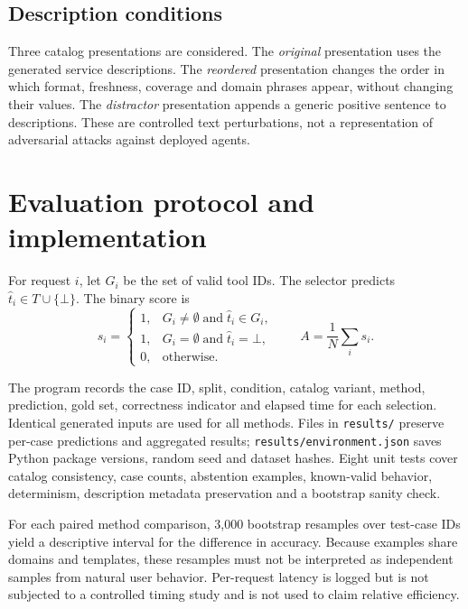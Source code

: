 \documentclass[10pt,a4paper]{article}
\begin{document}
\subsection{Description conditions}
Three catalog presentations are considered. The \emph{original} presentation uses the generated service descriptions. The \emph{reordered} presentation changes the order in which format, freshness, coverage and domain phrases appear, without changing their values. The \emph{distractor} presentation appends a generic positive sentence to descriptions. These are controlled text perturbations, not a representation of adversarial attacks against deployed agents.

\section{Evaluation protocol and implementation}
For request $i$, let $G_i$ be the set of valid tool IDs. The selector predicts $\hat{t}_i\in T\cup\{\bot\}$. The binary score is
\begin{equation}
 s_i=\begin{cases}
  1, & G_i\ne\emptyset\;\text{and}\;\hat{t}_i\in G_i,\\
  1, & G_i=\emptyset\;\text{and}\;\hat{t}_i=\bot,\\
  0, & \text{otherwise.}
 \end{cases}
\qquad A=\frac{1}{N}\sum_i s_i.
\end{equation}

The program records the case ID, split, condition, catalog variant, method, prediction, gold set, correctness indicator and elapsed time for each selection. Identical generated inputs are used for all methods. Files in \texttt{results/} preserve per-case predictions and aggregated results; \texttt{results/environment.json} saves Python package versions, random seed and dataset hashes. Eight unit tests cover catalog consistency, case counts, abstention examples, known-valid behavior, determinism, description metadata preservation and a bootstrap sanity check.

For each paired method comparison, 3,000 bootstrap resamples over test-case IDs yield a descriptive interval for the difference in accuracy. Because examples share domains and templates, these resamples must not be interpreted as independent samples from natural user behavior. Per-request latency is logged but is not subjected to a controlled timing study and is not used to claim relative efficiency.
\end{document}
